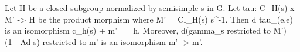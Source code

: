 Let H be a closed subgroup normalized by semisimple s in G. Let tau: C_H(s) x M' -> H be the product morphism where M' = Cl_H(s) s^{-1}. Then d tau_{(e,e)} is an isomorphism c_h(s) + m' ~= h. Moreover, d(gamma_s restricted to M') = (1 - Ad s) restricted to m' is an isomorphism m' -> m'.
